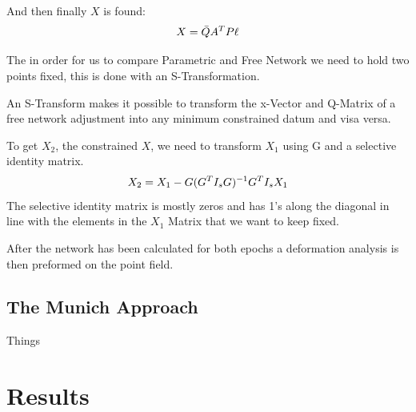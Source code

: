 \documentclass[11pt,a4paper]{article}
\begin{document}
			And then finally $X$ is found:
			\begin{equation}
			\notag
			X = \bar{Q} A^TP\ell	
			\end{equation}

			The in order for us to compare Parametric and Free Network we need to hold two points fixed, this is done with an S-Transformation.
			
			An S-Transform makes it possible to transform the x-Vector and Q-Matrix of a free network adjustment into any minimum constrained datum and visa versa.
			
			To get $X_2$, the constrained $X$, we need to transform $X_1$ using G and a selective identity matrix.
			\begin{equation}
			\notag
			X_2 = X_1 - G(G^TI_sG)^{-1} G^T I_s X_1
			\end{equation}
			The selective identity matrix is mostly zeros and has 1's along the diagonal in line with the elements in the $X_1$ Matrix that we want to keep fixed.
			
			After the network has been calculated for both epochs a deformation analysis is then preformed on the point field.
	
		\subsection{The Munich Approach}
			Things
	
	\section{Results}
	
	
	
\end{document}
